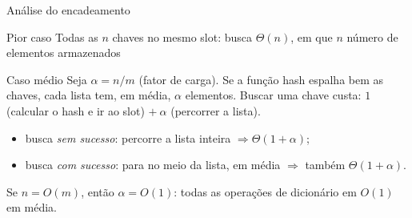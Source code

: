\documentclass[aspectratio=169,10pt]{beamer}
\begin{document}
\begin{frame}{Análise do encadeamento}
  \begin{alertblock}{Pior caso}
    Todas as $n$ chaves no mesmo slot: busca $\Theta(n)$, em que $n$ número de elementos armazenados
  \end{alertblock}
  \begin{block}{Caso médio}
    Seja $\alpha= n/m$ (fator de carga). Se a função hash espalha bem as chaves, cada lista tem, em média, $\alpha$ elementos.
    Buscar uma chave custa: $1$ (calcular o hash e ir ao slot) $+\ \alpha$ (percorrer a lista).
    \begin{itemize}
      \item busca \emph{sem sucesso}: percorre a lista inteira $\Rightarrow \Theta(1+\alpha)$;
      \item busca \emph{com sucesso}: para no meio da lista, em média $\Rightarrow$ também $\Theta(1+\alpha)$.
    \end{itemize}
    Se $n = O(m)$, então $\alpha = O(1)$: \alert{todas as operações de dicionário
    em $O(1)$ em média}.
  \end{block}
\end{frame}

\end{document}

